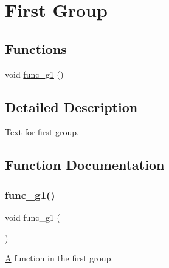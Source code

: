 \hypertarget{group__g1}{}\section{First Group}
\label{group__g1}
\subsection*{Functions}
\begin{DoxyCompactItemize}
\item 
void \mbox{\hyperlink{group__g1_gae84463e3941387a9da58279761e18d7e}{func\+\_\+g1}} ()
\end{DoxyCompactItemize}


\subsection{Detailed Description}
Text for first group. 

\subsection{Function Documentation}
\mbox{\label{group__g1_gae84463e3941387a9da58279761e18d7e}} 
\subsubsection{\texorpdfstring{func\_g1()}{func\_g1()}}
{\footnotesize\ttfamily void func\+\_\+g1 (\begin{DoxyParamCaption}{ }\end{DoxyParamCaption})}

\mbox{\hyperlink{class_a}{A}} function in the first group. 